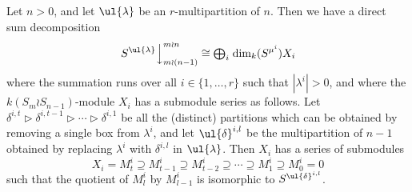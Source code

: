 \begin{theo}
Let $n>0$, and let $\ul{\lambda}$ be an $r$-multipartition of $n$. Then we have a direct sum decomposition
\[\left.S^{\ul{\lambda}}\right\downarrow^{m \wr n}_{m \wr (n-1)} \cong {\textstyle \bigoplus_i}\;\mathrm{dim}_k(S^{\mu^i})X_i\]
where the summation runs over all $i \in \{1,\ldots,r\}$ such that $|\lambda^i| > 0$, and where the $k(S_m \wr S_{n-1})$-module $X_i$ has a
submodule series as follows. Let $\delta^{i,t} \triangleright \delta^{i,t-1} \triangleright \cdots \triangleright \delta^{i,1}$ be all the
(distinct) partitions which can be obtained by removing a single box from $\lambda^i$, and let $\ul{\delta}^{i,l}$ be the multipartition
of $n-1$ obtained by replacing $\lambda^i$ with $\delta^{i,l}$ in $\ul{\lambda}$. Then $X_i$ has a series of submodules
\[ X_i  = M^i_t \supseteq M^i_{t-1} \supseteq M^i_{t-2} \supseteq \cdots \supseteq M^i_1 \supseteq M^i_0 = 0 \]
such that the quotient of $M^i_l$ by $M^i_{l-1}$ is isomorphic to $S^{\ul{\delta}^{i,l}}$.
\end{theo}
